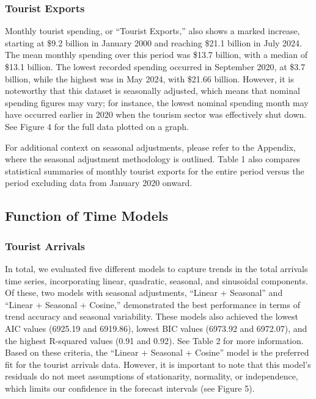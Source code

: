 \documentclass[11pt]{article}
\begin{document}
\subsubsection{Tourist Exports}

Monthly tourist spending, or ``Tourist Exports,'' also shows a marked increase, starting at \$9.2 billion in January 2000 and reaching \$21.1 billion in July 2024. The mean monthly spending over this period was \$13.7 billion, with a median of \$13.1 billion. The lowest recorded spending occurred in September 2020, at \$3.7 billion, while the highest was in May 2024, with \$21.66 billion. However, it is noteworthy that this dataset is seasonally adjusted, which means that nominal spending figures may vary; for instance, the lowest nominal spending month may have occurred earlier in 2020 when the tourism sector was effectively shut down. See Figure 4 for the full data plotted on a graph.

For additional context on seasonal adjustments, please refer to the Appendix, where the seasonal adjustment methodology is outlined. Table 1 also compares statistical summaries of monthly tourist exports for the entire period versus the period excluding data from January 2020 onward.

\subsection{Function of Time Models}

\subsubsection{Tourist Arrivals}

In total, we evaluated five different models to capture trends in the total arrivals time series, incorporating linear, quadratic, seasonal, and sinusoidal components. Of these, two models with seasonal adjustments, ``Linear + Seasonal'' and ``Linear + Seasonal + Cosine,'' demonstrated the best performance in terms of trend accuracy and seasonal variability. These models also achieved the lowest AIC values (6925.19 and 6919.86), lowest BIC values (6973.92 and 6972.07), and the highest R-squared values (0.91 and 0.92). See Table 2 for more information. Based on these criteria, the ``Linear + Seasonal + Cosine'' model is the preferred fit for the tourist arrivals data. However, it is important to note that this model's residuals do not meet assumptions of stationarity, normality, or independence, which limits our confidence in the forecast intervals (see Figure 5).
\end{document}
